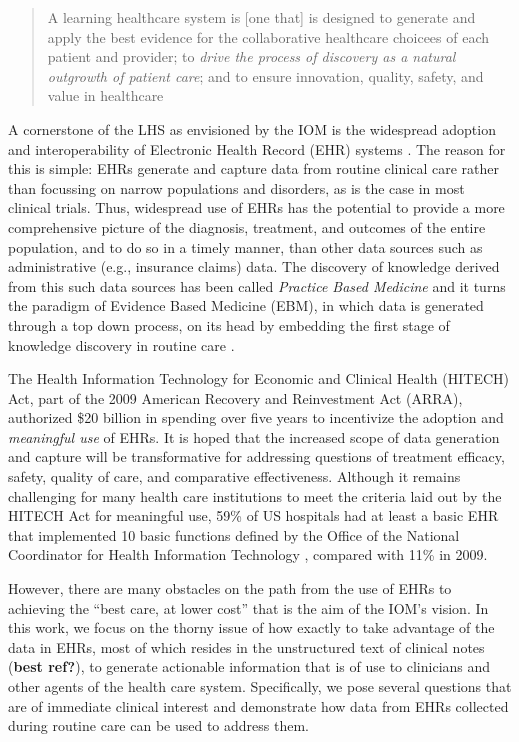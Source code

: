 \begin{quote}
A learning healthcare system is [one that] is designed to generate and
apply the best evidence for the collaborative healthcare choicees of
each patient and provider; to \emph{drive the process of discovery as a
natural outgrowth of patient care}; and to ensure innovation, quality,
safety, and value in healthcare
\end{quote}

\noindent A cornerstone of the LHS as envisioned by the IOM is the
widespread adoption and interoperability of Electronic Health Record
(EHR) systems \cite{IOMClinicalData}.  The reason for this is simple:
EHRs generate and capture data from routine clinical care rather than
focussing on narrow populations and disorders, as is the case in most
clinical trials.  Thus, widespread use of EHRs has the potential to
provide a more comprehensive picture of the diagnosis, treatment, and
outcomes of the entire population, and to do so in a timely manner,
than other data sources such as administrative (e.g., insurance
claims) data.  The discovery of knowledge derived from this such data
sources has been called \emph{Practice Based Medicine} and it turns
the paradigm of Evidence Based Medicine (EBM), in which data is
generated through a top down process, on its head by embedding the
first stage of knowledge discovery in routine care
\cite{Embi2013,Weng2012,Shah2012}.

The Health Information Technology for Economic and Clinical Health
(HITECH) Act, part of the 2009 American Recovery and Reinvestment
Act (ARRA), authorized \$20 billion in spending over five years to
incentivize the adoption and \emph{meaningful use} of EHRs.  It is
hoped that the increased scope of data generation and capture will be
transformative for addressing questions of treatment efficacy, safety,
quality of care, and comparative effectiveness.  Although it remains
challenging for many health care institutions to meet the criteria
laid out by the HITECH Act for meaningful use, 59\% of US hospitals
had at least a basic EHR that implemented 10 basic functions defined
by the Office of the National Coordinator for Health Information
Technology \cite{AdlerMillstein2014}, compared with 11\% in 2009.  

However, there are many obstacles on the path from the use of EHRs to
achieving the ``best care, at lower cost'' that is the aim of the
IOM's vision.  In this work, we focus on the thorny issue of how
exactly to take advantage of the data in EHRs, most of which resides
in the unstructured text of clinical notes (\textbf{best ref?}), to
generate actionable information that is of use to clinicians and other
agents of the health care system.  Specifically, we pose several
questions that are of immediate clinical interest and demonstrate how
data from EHRs collected during routine care can be used to address
them.


